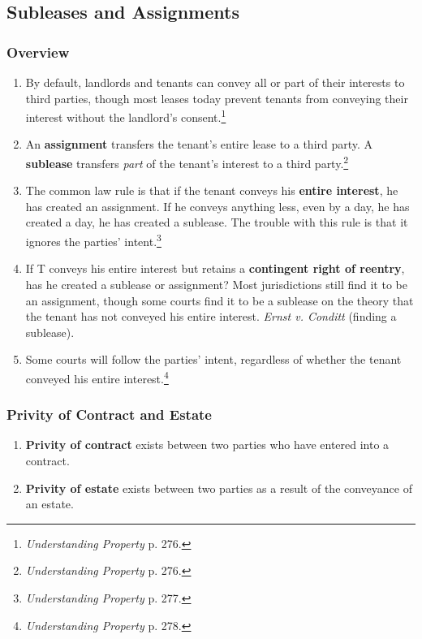 \subsection{Subleases and Assignments} %

\subsubsection{Overview}

\begin{enumerate}
    \item By default, landlords and tenants can convey all or part of their 
    interests to third parties, though most leases today prevent tenants from 
    conveying their interest without the landlord's 
    consent.\footnote{\emph{Understanding Property} p. 276.}
    \item An \textbf{assignment} transfers the tenant's entire lease to a 
    third party. A \textbf{sublease} transfers \emph{part} of the tenant's 
    interest to a third party.\footnote{\emph{Understanding Property} p. 276.}
    \item The common law rule is that if the tenant conveys his \textbf{entire 
    interest}, he has created an assignment. If he conveys anything less, even 
    by a day, he has created a day, he has created a sublease. The trouble 
    with this rule is that it ignores the parties' 
    intent.\footnote{\emph{Understanding Property} p. 277.}
    \item If T conveys his entire interest but retains a \textbf{contingent 
    right of reentry}, has he created a sublease or assignment? Most 
    jurisdictions still find it to be an assignment, though some courts find 
    it to be a sublease on the theory that the tenant has not conveyed his 
    entire interest. \emph{Ernst v. Conditt} (finding a sublease).
    \item Some courts will follow the parties' intent, regardless of whether 
    the tenant conveyed his entire interest.\footnote{\emph{Understanding 
    Property} p. 278.}
\end{enumerate}

\subsubsection{Privity of Contract and Estate}

\begin{enumerate}
    \item \textbf{Privity of contract} exists between two parties who have 
    entered into a contract.
    \item \textbf{Privity of estate} exists between two parties as a result of 
    the conveyance of an estate.
\end{enumerate}

